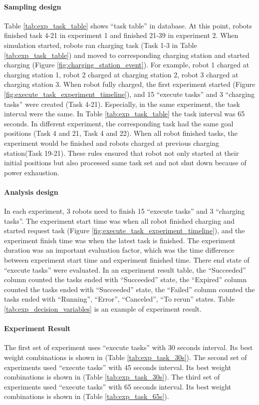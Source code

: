 \paragraph{Sampling design}
Table \ref{tab:exp_task_table} shows ``task table'' in database. At this point, robots finished task 4-21 in experiment 1 and finished 21-39 in experiment 2. When simulation started, robots ran charging task (Task 1-3 in Table \ref{tab:exp_task_table}) and moved to corresponding charging station and started charging (Figure \ref{fig:charging_station_event}). For example, robot 1 charged at charging station 1, robot 2 charged at charging station 2, robot 3 charged at charging station 3. 
    When robot fully charged, the first experiment started (Figure \ref{fig:execute_task_experiment_timeline}), and 15 ``execute tasks'' and 3 ``charging tasks'' were created (Task 4-21). Especially, in the same experiment, the task interval were the same. In Table \ref{tab:exp_task_table} the task interval was 65 seconds. In different experiment, the corresponding task had the same goal positions (Task 4 and 21, Task 4 and 22). 
    When all robot finished tasks, the experiment would be finished and robots charged at previous charging station(Task 19-21).
    These rules ensured that robot not only started at their initial positions but also processed same task set and not shut down because of power exhaustion.


\paragraph{Analysis design}
In each experiment, 3 robots need to finish 15 ``execute tasks'' and 3 ``charging tasks''.
The experiment start time was when all robot finished charging and started request task (Figure \ref{fig:execute_task_experiment_timeline}), and the experiment finish time was when the latest task is finished.
The experiment duration was an important evaluation factor, which was the time difference between experiment start time and experiment finished time.  
There end state of ``execute tasks'' were evaluated. In an experiment result table, the ``Succeeded'' column counted the tasks ended with ``Succeeded'' state, the ``Expired'' column counted the tasks ended with ``Succeeded'' state, the ``Failed'' column counted the tasks ended with ``Running'', ``Error'', ``Canceled'', ``To rerun'' states. 
Table \ref{tab:exp_decision_variables} is an example of experiment result. 

\paragraph{Experiment Result} 
The first set of experiment uses ``execute tasks'' with 30 seconds interval. Its best weight combinations is shown in (Table \ref{tab:exp_task_30s}).
The second set of experiments used ``execute tasks'' with 45 seconds interval. Its best weight combinations is shown in (Table \ref{tab:exp_task_30s}).
The third set of experiments used ``execute tasks'' with 65 seconds interval. Its best weight combinations is shown in (Table \ref{tab:exp_task_65s}).    
